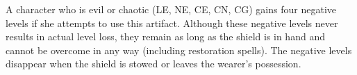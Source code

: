 A character who is evil or chaotic (LE, NE, CE, CN, CG) gains four negative levels if she attempts to use this artifact. Although these negative levels never results in actual level loss, they remain as long as the shield is in hand and cannot be overcome in any way (including restoration spells). The negative levels disappear when the shield is stowed or leaves the wearer's possession.
